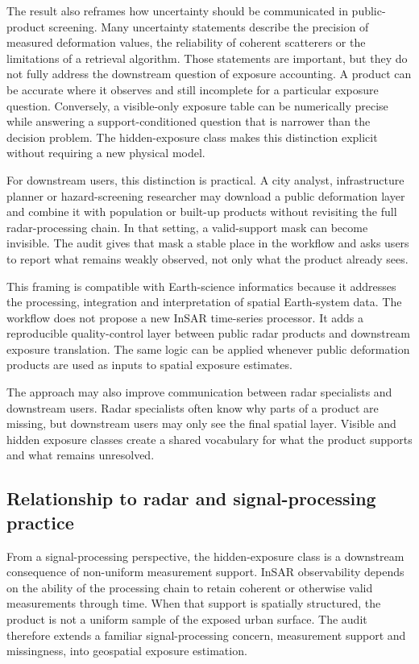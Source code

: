 \documentclass[pdflatex,sn-mathphys-ay]{sn-jnl}
\begin{document}
The result also reframes how uncertainty should be communicated in public-product screening. Many uncertainty statements describe the precision of measured deformation values, the reliability of coherent scatterers or the limitations of a retrieval algorithm. Those statements are important, but they do not fully address the downstream question of exposure accounting. A product can be accurate where it observes and still incomplete for a particular exposure question. Conversely, a visible-only exposure table can be numerically precise while answering a support-conditioned question that is narrower than the decision problem. The hidden-exposure class makes this distinction explicit without requiring a new physical model.

For downstream users, this distinction is practical. A city analyst, infrastructure planner or hazard-screening researcher may download a public deformation layer and combine it with population or built-up products without revisiting the full radar-processing chain. In that setting, a valid-support mask can become invisible. The audit gives that mask a stable place in the workflow and asks users to report what remains weakly observed, not only what the product already sees.

This framing is compatible with Earth-science informatics because it addresses the processing, integration and interpretation of spatial Earth-system data. The workflow does not propose a new InSAR time-series processor. It adds a reproducible quality-control layer between public radar products and downstream exposure translation. The same logic can be applied whenever public deformation products are used as inputs to spatial exposure estimates.

The approach may also improve communication between radar specialists and downstream users. Radar specialists often know why parts of a product are missing, but downstream users may only see the final spatial layer. Visible and hidden exposure classes create a shared vocabulary for what the product supports and what remains unresolved.

\subsection{Relationship to radar and signal-processing practice}

From a signal-processing perspective, the hidden-exposure class is a downstream consequence of non-uniform measurement support. InSAR observability depends on the ability of the processing chain to retain coherent or otherwise valid measurements through time. When that support is spatially structured, the product is not a uniform sample of the exposed urban surface. The audit therefore extends a familiar signal-processing concern, measurement support and missingness, into geospatial exposure estimation.
\end{document}
